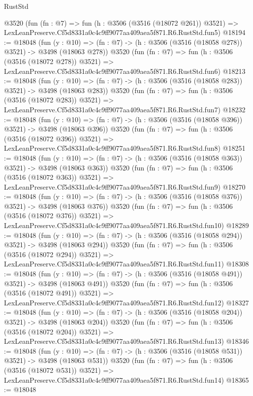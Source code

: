 \begin{lexlean}{RustStd}
\begin{coremodule}
    @3520
    (fun (fn : @7) =>
    fun (h : @3506 (@3516 (@18072 @261)) @3521) =>
    LexLeanPreserve.Cf5d8331a0c4c9ff9077aa409aea5f871.R6.RustStd.fun5)
@18194 := @18048
    (fun (y : @10) => (fn : @7) -> (h : @3506 (@3516 (@18058 @278)) @3521) -> @3498 (@18063 @278))
    @3520
    (fun (fn : @7) =>
    fun (h : @3506 (@3516 (@18072 @278)) @3521) =>
    LexLeanPreserve.Cf5d8331a0c4c9ff9077aa409aea5f871.R6.RustStd.fun6)
@18213 := @18048
    (fun (y : @10) => (fn : @7) -> (h : @3506 (@3516 (@18058 @283)) @3521) -> @3498 (@18063 @283))
    @3520
    (fun (fn : @7) =>
    fun (h : @3506 (@3516 (@18072 @283)) @3521) =>
    LexLeanPreserve.Cf5d8331a0c4c9ff9077aa409aea5f871.R6.RustStd.fun7)
@18232 := @18048
    (fun (y : @10) => (fn : @7) -> (h : @3506 (@3516 (@18058 @396)) @3521) -> @3498 (@18063 @396))
    @3520
    (fun (fn : @7) =>
    fun (h : @3506 (@3516 (@18072 @396)) @3521) =>
    LexLeanPreserve.Cf5d8331a0c4c9ff9077aa409aea5f871.R6.RustStd.fun8)
@18251 := @18048
    (fun (y : @10) => (fn : @7) -> (h : @3506 (@3516 (@18058 @363)) @3521) -> @3498 (@18063 @363))
    @3520
    (fun (fn : @7) =>
    fun (h : @3506 (@3516 (@18072 @363)) @3521) =>
    LexLeanPreserve.Cf5d8331a0c4c9ff9077aa409aea5f871.R6.RustStd.fun9)
@18270 := @18048
    (fun (y : @10) => (fn : @7) -> (h : @3506 (@3516 (@18058 @376)) @3521) -> @3498 (@18063 @376))
    @3520
    (fun (fn : @7) =>
    fun (h : @3506 (@3516 (@18072 @376)) @3521) =>
    LexLeanPreserve.Cf5d8331a0c4c9ff9077aa409aea5f871.R6.RustStd.fun10)
@18289 := @18048
    (fun (y : @10) => (fn : @7) -> (h : @3506 (@3516 (@18058 @294)) @3521) -> @3498 (@18063 @294))
    @3520
    (fun (fn : @7) =>
    fun (h : @3506 (@3516 (@18072 @294)) @3521) =>
    LexLeanPreserve.Cf5d8331a0c4c9ff9077aa409aea5f871.R6.RustStd.fun11)
@18308 := @18048
    (fun (y : @10) => (fn : @7) -> (h : @3506 (@3516 (@18058 @491)) @3521) -> @3498 (@18063 @491))
    @3520
    (fun (fn : @7) =>
    fun (h : @3506 (@3516 (@18072 @491)) @3521) =>
    LexLeanPreserve.Cf5d8331a0c4c9ff9077aa409aea5f871.R6.RustStd.fun12)
@18327 := @18048
    (fun (y : @10) => (fn : @7) -> (h : @3506 (@3516 (@18058 @204)) @3521) -> @3498 (@18063 @204))
    @3520
    (fun (fn : @7) =>
    fun (h : @3506 (@3516 (@18072 @204)) @3521) =>
    LexLeanPreserve.Cf5d8331a0c4c9ff9077aa409aea5f871.R6.RustStd.fun13)
@18346 := @18048
    (fun (y : @10) => (fn : @7) -> (h : @3506 (@3516 (@18058 @531)) @3521) -> @3498 (@18063 @531))
    @3520
    (fun (fn : @7) =>
    fun (h : @3506 (@3516 (@18072 @531)) @3521) =>
    LexLeanPreserve.Cf5d8331a0c4c9ff9077aa409aea5f871.R6.RustStd.fun14)
@18365 := @18048

\end{coremodule}
\end{lexlean}
